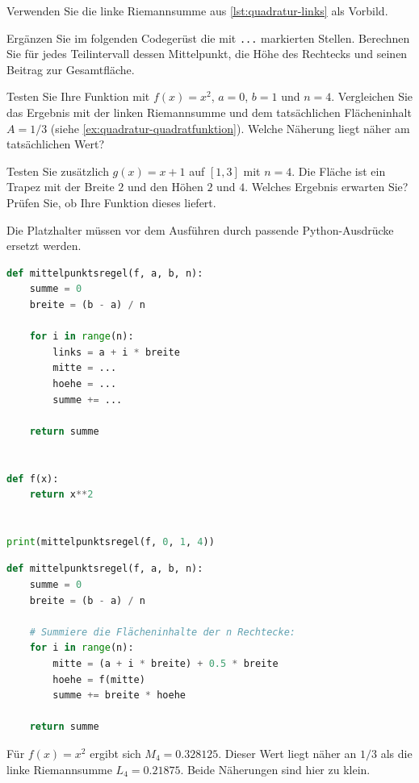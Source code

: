 \begin{myexercise}\label{ex:quadratur-mittelpunktsregel}
Verwenden Sie die linke Riemannsumme aus \cref{lst:quadratur-links} als Vorbild.
\begin{aenum}
    \item Ergänzen Sie im folgenden Codegerüst die mit \lstinline|...| markierten Stellen. Berechnen Sie für jedes Teilintervall dessen Mittelpunkt, die Höhe des Rechtecks und seinen Beitrag zur Gesamtfläche.
    \item Testen Sie Ihre Funktion mit $f(x)=x^2$, $a=0$, $b=1$ und $n=4$. Vergleichen Sie das Ergebnis mit der linken Riemannsumme und dem tatsächlichen Flächeninhalt $A=1/3$ (siehe \cref{ex:quadratur-quadratfunktion}). Welche Näherung liegt näher am tatsächlichen Wert?
    \item Testen Sie zusätzlich $g(x)=x+1$ auf $[1,3]$ mit $n=4$. Die Fläche ist ein Trapez mit der Breite $2$ und den Höhen $2$ und $4$. Welches Ergebnis erwarten Sie? Prüfen Sie, ob Ihre Funktion dieses liefert.
\end{aenum}
Die Platzhalter müssen vor dem Ausführen durch passende Python-Ausdrücke ersetzt werden.

\begin{lstlisting}[language=Python, caption={Codegerüst zur Mittelpunktsregel}]
def mittelpunktsregel(f, a, b, n):
    summe = 0
    breite = (b - a) / n

    for i in range(n):
        links = a + i * breite
        mitte = ...
        hoehe = ...
        summe += ...

    return summe


def f(x):
    return x**2


print(mittelpunktsregel(f, 0, 1, 4))
\end{lstlisting}

\begin{myanswer}
\begin{lstlisting}[language=Python, caption={Musterlösung zur Mittelpunktsregel}, label={lst:quadratur-mitte}]
def mittelpunktsregel(f, a, b, n):
    summe = 0
    breite = (b - a) / n

    # Summiere die Flächeninhalte der n Rechtecke:
    for i in range(n):
        mitte = (a + i * breite) + 0.5 * breite
        hoehe = f(mitte)
        summe += breite * hoehe

    return summe
\end{lstlisting}

Für $f(x)=x^2$ ergibt sich $M_4=0.328125$. Dieser Wert liegt näher an $1/3$ als die linke Riemannsumme $L_4=0.21875$. Beide Näherungen sind hier zu klein.


\end{myanswer}
\end{myexercise}
